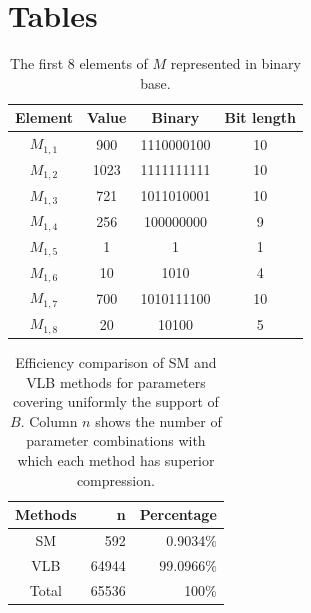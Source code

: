 \documentclass[10pt]{article}
\begin{document}

\newpage

\section*{Tables}

\begin{table}[h]
 \centering
 \caption{The first 8 elements of $M$ represented in binary base.}
 \begin{tabular}{cccc} 
  \hline 
  Element & Value  & Binary & Bit length\\
  \hline
  $M_{1,1}$ & 900  & 1110000100 & 10\\
  $M_{1,2}$ & 1023 & 1111111111 & 10\\
  $M_{1,3}$ & 721  & 1011010001 & 10\\
  $M_{1,4}$ & 256  & 100000000  & 9\\
  $M_{1,5}$ & 1    & 1          & 1\\
  $M_{1,6}$ & 10   & 1010       & 4\\
  $M_{1,7}$ & 700  & 1010111100 & 10\\
  $M_{1,8}$ & 20   & 10100      & 5\\
  \hline
 \end{tabular}
 \label{tab:01}
\end{table}

\begin{table}[h]
 \centering
 \caption{Efficiency comparison of SM and VLB methods for parameters covering 
uniformly the support of $B$. Column $n$ shows the number of parameter 
combinations with which each method has superior compression.}
 \begin{tabular}{crr}
  \hline 
  Methods  & n   & Percentage \\
  \hline
  SM	   & 592	& 0.9034\% \\
  VLB	   & 64944	& 99.0966\% \\
  \hline
  Total    & 65536	& 100\% \\
  \hline
 \end{tabular}
 \label{tab:02}
\end{table}
\end{document}
